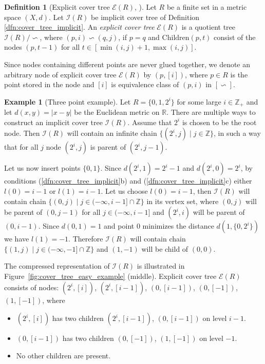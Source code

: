 \documentclass{vgtc}                          %
\numberwithin{algocf}{section}
\theoremstyle{definition}
\newtheorem{dfn}[algocf]{Definition}
\theoremstyle{definition}
\newtheorem{exa}[algocf]{Example}
\theoremstyle{definition}
\theoremstyle{plain}
\newcommand{\Child}{\mathrm{Children}}
\newcommand{\R}{\mathbb{R}}
\newcommand{\Z}{\mathbb{Z}}
\newcommand{\I}{\mathcal{I}}
\newcommand{\T}{\mathcal{E}}
\begin{document}
\begin{dfn}[Explicit cover tree $\T(R)$, {\cite[Section~2]{beygelzimer2006cover}}]
\label{dfn:cover_tree_explicit}
Let $R$ be a finite set in a metric space $(X,d)$. Let $\I(R)$ be implicit cover tree of Definition \ref{dfn:cover_tree_implicit}. An \emph{explicit cover tree} $\T(R)$ is a quotient tree $\I(R) / \backsim$, where $(p,i) \backsim (q,j)$, if $p = q$ and $\Child(p,t)$ consist of the nodes $(p, t-1)$ for all $t \in [\min(i,j)+1, \max(i,j)]$. 
\end{dfn}

\noindent
Since nodes containing different points are never glued together, we denote an arbitrary node of explicit cover tree $\T(R)$ by $(p,[i])$, where $p \in R$ is the point stored in the node and $[i]$ is equivalence class of $(p,i)$ in $[\backsim]$. 

\begin{exa}[Three point example]
Let $R = \{0,1,2^{i}\}$ for some large $i \in \Z_{+}$ and let $d(x,y) = |x-y|$ be the Euclidean metric on $\R$. 
There are multiple ways to construct an implicit cover tree $\I(R)$. Assume that $2^{i}$ is chosen to be the root node. Then $\I(R)$ will contain an infinite chain $\{(2^{i},j) \mid j \in \Z\}$, in such a way that for all $j$ node $(2^{i},j) $ is parent of $(2^{i},j-1)$.

\medskip
\noindent
Let us now insert points $\{0,1\}$. Since $d(2^{i},1) = 2^{i}-1$ and $d(2^{i},0) = 2^{i}$, by conditions (\ref{dfn:cover_tree_implicit}b) and (\ref{dfn:cover_tree_implicit}c) either $l(0) = i-1$ or $l(1) = i-1$. Let us choose $l(0) = i-1$, then $\I(R)$ will contain chain $\{(0,j) \mid j \in (-\infty, i-1] \cap \Z\}$ in its vertex set, where $(0,j)$ will be parent of $(0,j-1)$ for all $j \in (-\infty, i-1]$ and $(2^{i},i)$ will be parent of $(0,i-1)$. Since $d(0,1) = 1$ and point $0$ minimizes the distance $d(1, \{0,2^{i}\})$ we have $l(1) = -1$. Therefore $\I(R)$ will contain chain $\{(1,j) \mid j \in (-\infty, -1] \cap \Z\}$ and $(1,-1)$ will be child of $(0,0)$.

\medskip
\noindent
The compressed representation of $\I(R)$ is illustrated in Figure~\ref{fig:cover_tree_easy_example} (middle). Explicit cover tree $\T(R)$ consists of nodes: $(2^{i}, [i])$, $(2^{i}, [i-1])$, $(0,[i-1])$, $(0,[-1])$, $(1,[-1])$,
where 
\begin{itemize}
    \item $(2^{i}, [i])$ has two children $(2^{i}, [i-1])$,  $(0,[i-1])$ on level $i-1$.
    \item $(0,[i-1])$ has two children $(0, [-1])$,  $(1,[-1])$ on level $-1$.
    \item No other children are present. 
\end{itemize}


\end{exa}
\end{document}
